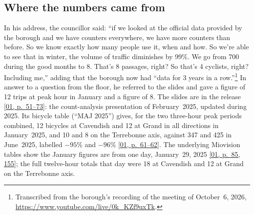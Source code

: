 \documentclass[11pt,letterpaper]{article}
\newcommand{\pagesurl}{https://openmobilitydata.github.io/Terrebonne-access-requests}
\newcommand{\pgl}[3]{\href{\pagesurl/\csname bundle#1\endcsname\#page=#2}{\textsf{\small[#1, p.~#3]}}}
\begin{document}
\subsection{Where the numbers came from}

In his address, the councillor said: ``if we looked at the official data
provided by the borough and we have counters everywhere, we have more
counters than before. So we know exactly how many people use it, when and
how. So we're able to see that in winter, the volume of traffic diminishes
by 99\%. We go from 700 during the good months to 8. That's 8 passages,
right? So that's 4 cyclists, right? Including me,'' adding that the borough
now had ``data for 3 years in a row.''\footnote{Transcribed from the
borough's recording of the meeting of October~6, 2026,
\url{https://www.youtube.com/live/0k_KZf9uxTk}.} In answer to a question
from the floor, he referred to the slides and gave a figure of 12 trips at
peak hour in January and a figure of 8. The slides are in the
release \pgl{01}{51}{51--73}: the count-analysis presentation of February~2025,
updated during 2025. Its bicycle table (``MAJ 2025'') gives, for the two
three-hour peak periods combined, 12 bicycles at Cavendish and 12 at Grand
in all directions in January~2025, and 10 and 8 on the Terrebonne axis,
against 347 and 425 in June~2025, labelled $-95$\% and $-96$\%
\pgl{01}{61}{61--62}. The underlying Miovision tables show the January figures
are from one day, January~29, 2025 \pgl{01}{85}{85, 155}; the full twelve-hour
totals that day were 18 at Cavendish and 12 at Grand on the Terrebonne axis.
\end{document}
